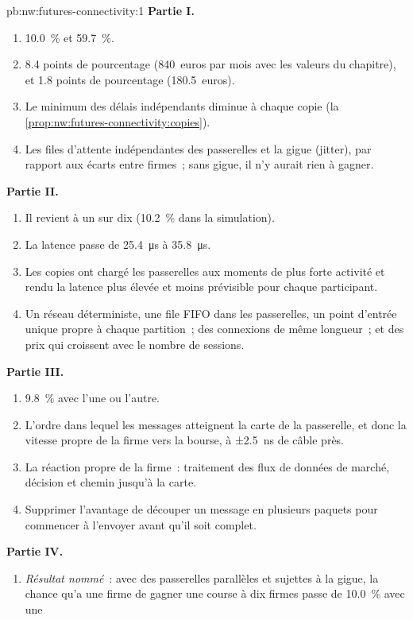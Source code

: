 \begin{solution}{pb:nw:futures-connectivity:1}
\textbf{Partie I.}
\begin{enumerate}
\item 10.0~\% et 59.7~\%.
\item 8.4 points de pourcentage (840~euros par mois avec les valeurs du chapitre), et 1.8 points de pourcentage (180.5~euros).
\item Le minimum des délais indépendants diminue à chaque copie (la \cref{prop:nw:futures-connectivity:copies}).
\item Les files d'attente indépendantes des passerelles et la gigue (jitter), par rapport aux écarts entre firmes~; sans gigue, il n'y aurait rien
  à gagner.
\end{enumerate}
\textbf{Partie II.}
\begin{enumerate}[resume]
\item Il revient à un sur dix (10.2~\% dans la simulation).
\item La latence passe de \qty{25.4}{\micro\second} à \qty{35.8}{\micro\second}.
\item Les copies ont chargé les passerelles aux moments de plus forte activité et rendu la latence plus élevée et moins prévisible pour chaque participant.
\item Un réseau déterministe, une file FIFO dans les passerelles, un point d'entrée unique propre à chaque partition~; des connexions de même longueur~; et
  des prix qui croissent avec le nombre de sessions.
\end{enumerate}
\textbf{Partie III.}
\begin{enumerate}[resume]
\item 9.8~\% avec l'une ou l'autre.
\item L'ordre dans lequel les messages atteignent la carte de la passerelle, et donc la vitesse propre de la firme vers la bourse, à ±2.5~ns de câble près.
\item La réaction propre de la firme~: traitement des flux de données de marché, décision et chemin jusqu'à la carte.
\item Supprimer l'avantage de découper un message en plusieurs paquets pour commencer à l'envoyer avant qu'il soit complet.
\end{enumerate}
\textbf{Partie IV.}
\begin{enumerate}[resume]
\item \emph{Résultat nommé}~: avec des passerelles parallèles et sujettes à la gigue, la chance qu'a une firme de gagner une course à dix firmes passe de 10.0~\% avec une

\end{enumerate}
\end{solution}
